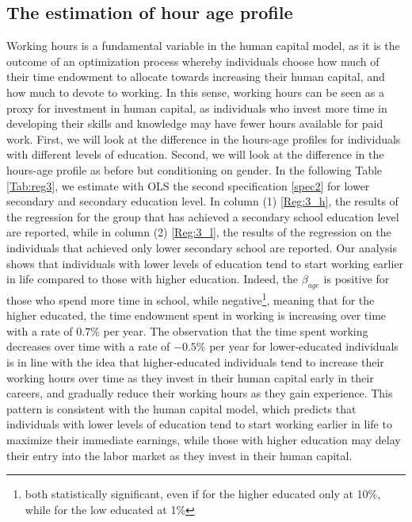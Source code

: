 \documentclass[12pt]{article}
\begin{document}
\subsection{The estimation of hour age profile}
Working hours is a fundamental variable in the human capital model, as it is the outcome of an optimization process
whereby individuals choose how much of their time endowment to allocate towards increasing their human capital, and how
much to devote to working. In this sense, working hours can be seen as a proxy for investment in human capital, as
individuals who invest more time in developing their skills and knowledge may have fewer hours available for paid
work.\newline
First, we will look at the difference in the hours-age profiles for individuals with different levels of education. Second, we will look at the difference in the hours-age profile as before but conditioning on gender. In the following Table \ref{Tab:reg3}, we estimate with OLS the second specification \ref{spec2} for lower secondary and secondary education level. In column (1) \ref{Reg:3_h}, the results of the regression for the group that has achieved a secondary school education level are reported, while in column (2) \ref{Reg:3_l}, the results of the regression on the individuals that achieved only lower secondary school are reported.
\newline
Our analysis shows that individuals with lower levels of education tend to start working earlier in life compared to
those with higher education. Indeed, the $\beta_{age}$ is positive for those who spend more time in school, while
negative\footnote{both statistically significant, even if for the higher educated only at 10\%, while for the low
educated at 1\%}, meaning that for the higher educated, the time endowment spent in working is increasing over time with
a rate of $0.7\%$ per year.  The observation that the time spent working decreases over time with a rate of $-0.5\%$ per
year for lower-educated individuals is in line with the idea that higher-educated individuals tend to increase their
working hours over time as they invest in their human capital early in their careers, and gradually reduce their working
hours as they gain experience. This pattern is consistent with the human capital model, which predicts that individuals
with lower levels of education tend to start working earlier in life to maximize their immediate earnings, while those
with higher education may delay their entry into the labor market as they invest in their human capital.
\newline
\end{document}
